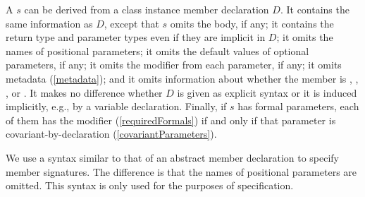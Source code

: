 \documentclass[makeidx]{article}
\begin{document}

\LMHash{}%
A  $s$
can be derived from a class instance member declaration $D$.
It contains the same information as $D$,
except that $s$ omits the body, if any;
it contains the return type and parameter types
even if they are implicit in $D$;
it omits the names of positional parameters;
it omits the default values of optional parameters, if any;
it omits the modifier \FINAL{} from each parameter, if any;
it omits metadata
(\ref{metadata});
and it omits information about whether the member is
\EXTERNAL, \ASYNC, \ASYNC*, or \SYNC*.
It makes no difference whether $D$ is given as explicit syntax
or it is induced implicitly, e.g., by a variable declaration.
Finally, if $s$ has formal parameters,
each of them has the modifier \COVARIANT{}
(\ref{requiredFormals})
if and only if that parameter is covariant-by-declaration
(\ref{covariantParameters}).

\LMHash{}%
We use a syntax similar to that of an abstract member declaration
to specify member signatures.
The difference is that the names of positional parameters are omitted.
This syntax is only used for the purposes of specification.

\end{document}
